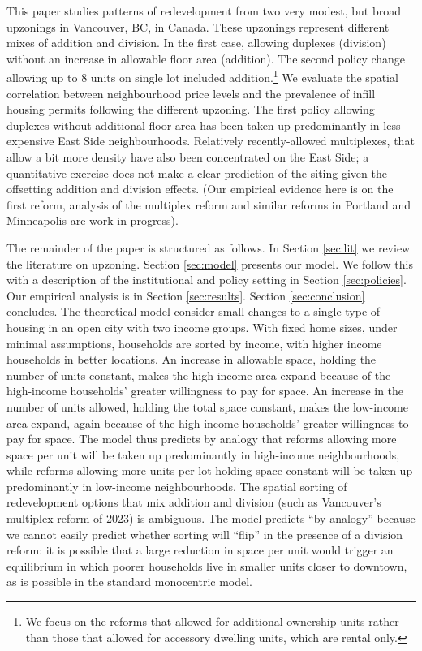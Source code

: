 \documentclass[12pt]{article}
\begin{document}
This paper studies patterns of redevelopment from two very modest, but broad upzonings in Vancouver, BC, in Canada. These upzonings represent different mixes of addition and division. In the first case, allowing duplexes (division) without an increase in allowable floor area (addition). The second policy change allowing up to 8 units on single lot included addition.\footnote{We focus on the reforms that allowed for additional ownership units rather than those that allowed for accessory dwelling units, which are rental only.} We evaluate the spatial correlation between neighbourhood price levels and the prevalence of infill housing permits following the different upzoning. The first policy allowing duplexes without additional floor area has been taken up predominantly in less expensive East Side neighbourhoods. Relatively recently-allowed multiplexes, that allow a bit more density have also been concentrated on the East Side; a quantitative exercise does not make a clear prediction of the siting given the offsetting addition and division effects. (Our empirical evidence here is on the first reform, analysis of the multiplex reform and similar reforms in Portland and Minneapolis are work in progress).

The remainder of the paper is structured as follows. In Section \ref{sec:lit} we review the literature on upzoning. Section \ref{sec:model} presents our model. We follow this with a description of the institutional and policy setting in Section \ref{sec:policies}. Our empirical analysis is in Section \ref{sec:results}. Section \ref{sec:conclusion} concludes. The theoretical model consider small changes to a single type of housing in an open city with two income groups. With fixed home sizes, under minimal assumptions, households are sorted by income, with higher income households in better locations. An increase in allowable space, holding the number of units constant, makes the high-income area expand because of the high-income households' greater willingness to pay for space. An increase in the number of units allowed, holding the total space constant, makes the low-income area expand, again because of the high-income households' greater willingness to pay for space. The model thus predicts by analogy that reforms allowing more space per unit will be taken up predominantly in high-income neighbourhoods, while reforms allowing more units per lot holding space constant will be taken up predominantly in low-income neighbourhoods. The spatial sorting of redevelopment options that mix addition and division (such as Vancouver's multiplex reform of 2023) is ambiguous. The model predicts ``by analogy'' because we cannot easily predict whether sorting will ``flip'' in the presence of a division reform: it is possible that a large reduction in space per unit would trigger an equilibrium in which poorer households live in smaller units closer to downtown, as is possible in the standard monocentric model. 
\end{document}
